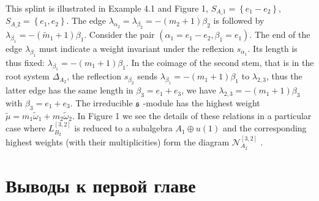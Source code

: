 \begin{itemize}
This splint is illustrated in Example 4.1 and Figure 1, 
$S_{A\_1}=\left\{ e_{1}-e_{2}\right\} $, $S_{A\_2}=\left\{
e_{1},e_{2}\right\} $. The edge $\lambda _{\alpha _{2}}=\lambda
_{\beta _{2}}=-\left( m_{2}+1\right) \beta _{2}$ is followed by
$\lambda _{\beta _{1}}=-\left( \widetilde{m}_{1}+1\right) \beta
_{1}$. Consider the pair $\left( \alpha
_{1}=e_{1}-e_{2},\beta _{1}=e_{1}\right)$. The end of the edge
$\lambda _{\beta _{1}}$ must indicate a weight
invariant under the reflexion $s_{\alpha _{1}}$.  Its length is thus fixed: 
$\lambda _{\beta _{1}}=-\left( m_{1}+1\right) \beta _{1}$. In the
coimage of
the second stem, that is in the root system $\Delta_{A_{2}}$, the reflection 
$s_{\beta _{2}}$ sends $\lambda _{\beta _{1}}=-\left(
m_{1}+1\right) \beta
_{1}$ to $\lambda _{2,3}$, thus the latter edge has the same length in $%
\beta _{3}=e_{1}+e_{3}$, we have $\lambda _{2,3}=-\left(
m_{1}+1\right)
\beta _{3}$ with $\beta _{3}=e_{1}+e_{3}$. The irreducible $\frak{s}$%
-module has the highest weight $\widetilde{\mu }=m_{1}\widetilde{\omega }%
_{1}+m_{2}\widetilde{\omega }_{2}$. In Figure 1 we see the
details of these relations in a particular case where
$L_{B_{2}}^{\left[ 3,2\right] }$ is reduced to a subalgebra
$A_{1}\oplus u\left( 1\right) $ and the
corresponding highest weights (with their multiplicities) form the diagram $%
\mathcal{N}_{A_2}^{\left[ 3,2\right] }$ .
\end{itemize}



\section{Выводы к первой главе}



